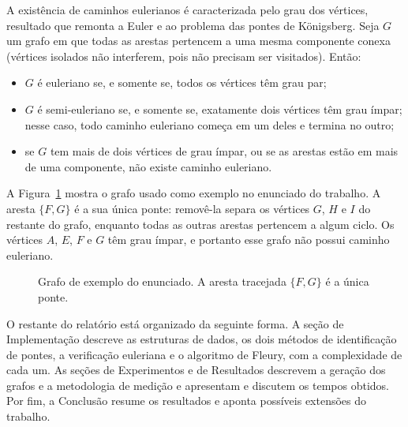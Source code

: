 A existência de caminhos eulerianos é caracterizada pelo grau dos vértices, resultado que remonta a Euler e ao problema das pontes de Königsberg. Seja $G$ um grafo em que todas as arestas pertencem a uma mesma componente conexa (vértices isolados não interferem, pois não precisam ser visitados). Então:

\begin{itemize}
  \item $G$ é euleriano se, e somente se, todos os vértices têm grau par;
  \item $G$ é semi-euleriano se, e somente se, exatamente dois vértices têm grau ímpar; nesse caso, todo caminho euleriano começa em um deles e termina no outro;
  \item se $G$ tem mais de dois vértices de grau ímpar, ou se as arestas estão em mais de uma componente, não existe caminho euleriano.
\end{itemize}

A Figura~\ref{fig:exemplo} mostra o grafo usado como exemplo no enunciado do trabalho. A aresta $\{F, G\}$ é a sua única ponte: removê-la separa os vértices $G$, $H$ e $I$ do restante do grafo, enquanto todas as outras arestas pertencem a algum ciclo. Os vértices $A$, $E$, $F$ e $G$ têm grau ímpar, e portanto esse grafo não possui caminho euleriano.

\begin{figure}[H]
  \centering
  \caption{Grafo de exemplo do enunciado. A aresta tracejada $\{F, G\}$ é a única ponte.}
  \label{fig:exemplo}
\end{figure}

O restante do relatório está organizado da seguinte forma. A seção de Implementação descreve as estruturas de dados, os dois métodos de identificação de pontes, a verificação euleriana e o algoritmo de Fleury, com a complexidade de cada um. As seções de Experimentos e de Resultados descrevem a geração dos grafos e a metodologia de medição e apresentam e discutem os tempos obtidos. Por fim, a Conclusão resume os resultados e aponta possíveis extensões do trabalho.
